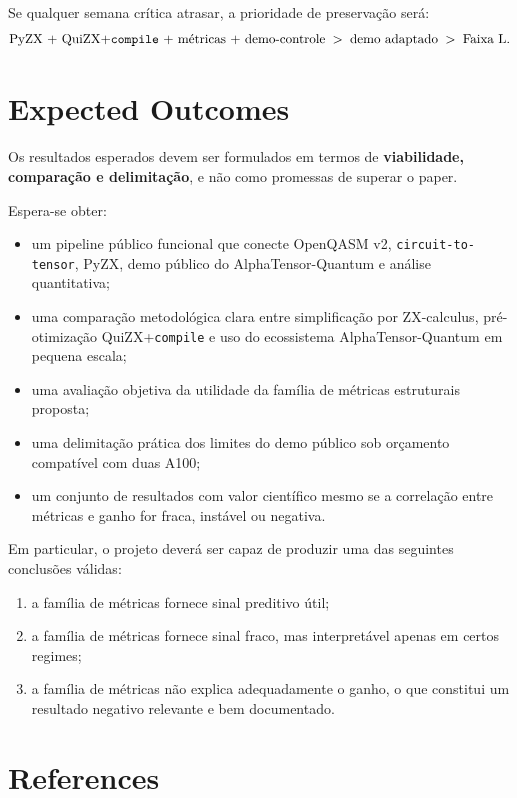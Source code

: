 \documentclass[a4paper,11pt]{article}
\begin{document}
Se qualquer semana crítica atrasar, a prioridade de preservação será:
\[
\text{PyZX + QuiZX+\texttt{compile} + métricas + demo-controle} \;>\; \text{demo adaptado} \;>\; \text{Faixa L}.
\]

\section{Expected Outcomes}

Os resultados esperados devem ser formulados em termos de \textbf{viabilidade, comparação e delimitação}, e não como promessas de superar o paper.

Espera-se obter:
\begin{itemize}
  \item um pipeline público funcional que conecte OpenQASM v2, \texttt{circuit-to-tensor}, PyZX, demo público do AlphaTensor-Quantum e análise quantitativa;
  \item uma comparação metodológica clara entre simplificação por ZX-calculus, pré-otimização QuiZX+\texttt{compile} e uso do ecossistema AlphaTensor-Quantum em pequena escala;
  \item uma avaliação objetiva da utilidade da família de métricas estruturais proposta;
  \item uma delimitação prática dos limites do demo público sob orçamento compatível com duas A100;
  \item um conjunto de resultados com valor científico mesmo se a correlação entre métricas e ganho for fraca, instável ou negativa.
\end{itemize}

Em particular, o projeto deverá ser capaz de produzir uma das seguintes conclusões válidas:
\begin{enumerate}
  \item a família de métricas fornece sinal preditivo útil;
  \item a família de métricas fornece sinal fraco, mas interpretável apenas em certos regimes;
  \item a família de métricas não explica adequadamente o ganho, o que constitui um resultado negativo relevante e bem documentado.
\end{enumerate}

\section{References}
\end{document}
